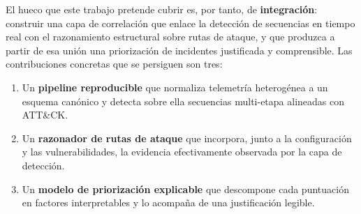 El hueco que este trabajo pretende cubrir es, por tanto, de \textbf{integración}: construir
una capa de correlación que enlace la detección de secuencias en tiempo real con el
razonamiento estructural sobre rutas de ataque, y que produzca a partir de esa unión una
priorización de incidentes justificada y comprensible. Las contribuciones concretas que se
persiguen son tres:

\begin{enumerate}
    \item Un \textbf{pipeline reproducible} que normaliza telemetría heterogénea a un
    esquema canónico y detecta sobre ella secuencias multi-etapa alineadas con ATT\&CK.
    \item Un \textbf{razonador de rutas de ataque} que incorpora, junto a la configuración y
    las vulnerabilidades, la evidencia efectivamente observada por la capa de detección.
    \item Un \textbf{modelo de priorización explicable} que descompone cada puntuación en
    factores interpretables y lo acompaña de una justificación legible.
\end{enumerate}

